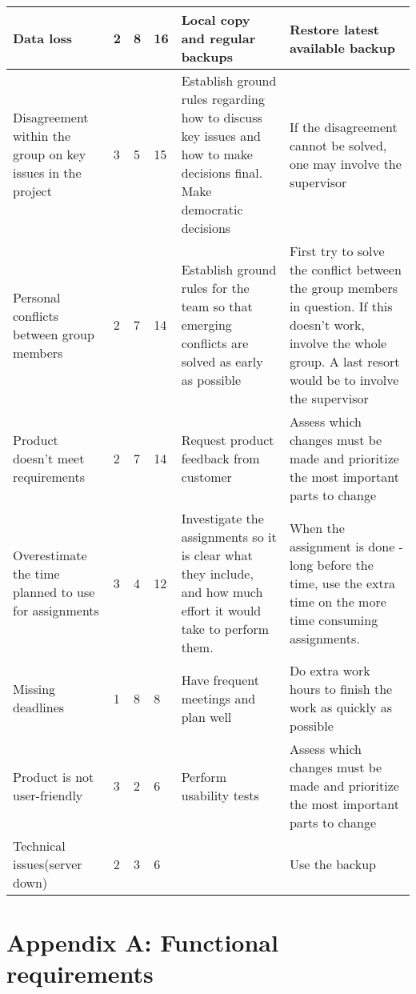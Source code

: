 \begin{longtable}{ | p{3.5cm} | p{2cm} | p{1.5cm} | p{2cm} | p{3.5cm} | p{3.5cm} |}
	Data loss & 2 & 8 & 16 & Local copy and regular backups & Restore latest available backup \\ \hline
	
	Disagreement within the group on key issues in the project & 3 & 5 & 15 & Establish ground rules regarding how to discuss key issues and how to make decisions final. Make democratic decisions & If the disagreement cannot be solved, one may involve the supervisor \\ \hline
	
	Personal conflicts between group members & 2 & 7 & 14 & Establish ground rules for the team so that emerging conflicts are solved as early as possible & First try to solve the conflict between the group members in question. If this doesn't work, involve the whole group. A last resort would be to involve the supervisor \\ \hline
	
	Product doesn't meet requirements & 2 & 7 & 14 & Request product feedback from customer & Assess which changes must be made and prioritize the most important parts to change \\ \hline
	
	Overestimate the time planned to use for assignments & 3 & 4 & 12 & Investigate the assignments so it is clear what they include, and how much effort it would take to perform them. & When the assignment is done - long before the time, use the extra time on the more time consuming assignments. \\ \hline
	
	Missing deadlines & 1 & 8 & 8 & Have frequent meetings and plan well & Do extra work hours to finish the work as quickly as possible \\ \hline
	
	Product is not user-friendly & 3 & 2 & 6 & Perform usability tests & Assess which changes must be made and prioritize the most important parts to change \\ \hline
	
	Technical issues(server down) & 2 & 3 & 6 & & Use the backup \\ \hline
\end{longtable}

\noindent
\section{Appendix A: Functional requirements}

